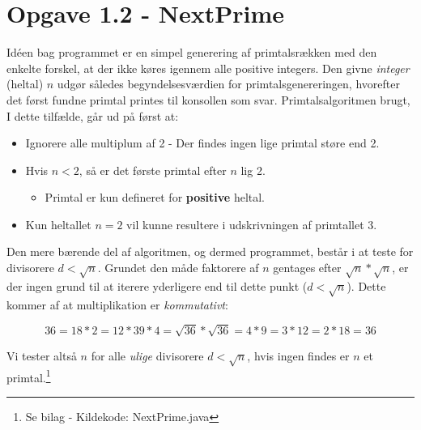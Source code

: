 \section{Opgave 1.2 - NextPrime}

Idéen bag programmet er en simpel generering af primtalsrækken med den enkelte forskel, at der ikke køres igennem alle positive integers. Den givne \textit{integer} (heltal) $n$ udgør således begyndelsesværdien for primtalsgenereringen, hvorefter det først fundne primtal printes til konsollen som svar. Primtalsalgoritmen brugt, I dette tilfælde, går ud på først at: 

\begin{itemize}
	\item Ignorere alle multiplum af 2 - Der findes ingen lige primtal støre end 2.
	\item Hvis $n<2$, så er det første primtal efter $n$ lig 2. 
	\begin{itemize}
		\item Primtal er kun defineret for \textbf{positive} heltal.
	\end{itemize}
	\item Kun heltallet $n=2$ vil kunne resultere i udskrivningen af primtallet 3.
\end{itemize}

\noindent Den mere bærende del af algoritmen, og dermed programmet, består i at teste for divisorere $d<\sqrt{n}$. Grundet den måde faktorere af $n$ gentages efter $\sqrt{n}*\sqrt{n}$, er der ingen grund til at iterere yderligere end til dette punkt ($d<\sqrt{n}$). Dette kommer af at multiplikation er \emph{kommutativt}:

\begin{equation*}
	36 = 18*2 = 12*3 9*4 = \sqrt{36}*\sqrt{36} = 4*9 = 3*12 = 2*18 = 36
\end{equation*}

\noindent Vi tester altså $n$ for alle \textit{ulige} divisorere $d<\sqrt{n}$, hvis ingen findes er $n$ et primtal.\footnote{Se bilag - Kildekode: NextPrime.java}